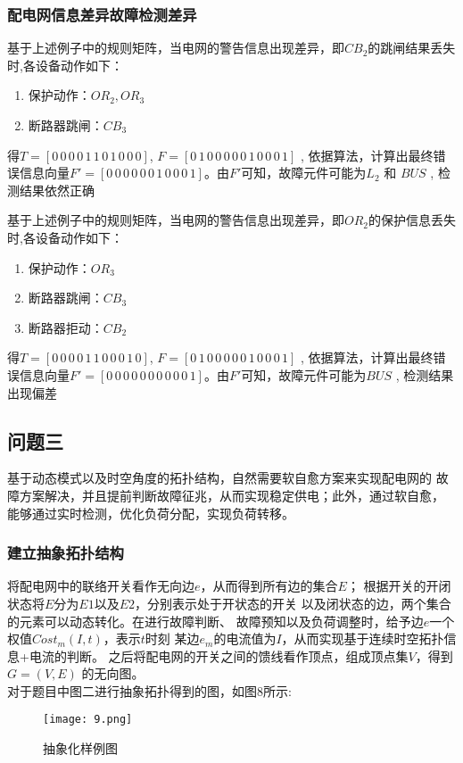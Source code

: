 \documentclass[withoutpreface,bwprint]{cumcmthesis} %
\begin{document}
\subsubsection{配电网信息差异故障检测差异}
\indent 基于上述例子中的规则矩阵，当电网的警告信息出现差异，即$CB_2$的跳闸结果丢失时,各设备动作如下：
\begin{enumerate}[itemindent=4em]
    \item 保护动作：$OR_2 , OR_3$
    \item 断路器跳闸：$CB_3$
\end{enumerate}
得$T = [0\,0\,0\,0\,1\,1\,0\,1\,0\,0\,0] $, $F = [0\,1\,0\,0\,0\,0\,0\,1\,0\,0\,0\,1]$ , 依据算法，计算出最终错误信息向量$F' = [0\,0\,0\,0\,0\,0\,1\,0\,0\,0\,1]$。由$F'$可知，故障元件可能为$L_2$ 和 $BUS$ , 检测结果依然正确

\indent 基于上述例子中的规则矩阵，当电网的警告信息出现差异，即$OR_2$的保护信息丢失时,各设备动作如下：
\begin{enumerate}[itemindent=4em]
    \item 保护动作：$OR_3$
    \item 断路器跳闸：$CB_3$
    \item 断路器拒动：$CB_2$
\end{enumerate}
得$T = [0\,0\,0\,0\,1\,1\,0\,0\,0\,1\,0] $, $F = [0\,1\,0\,0\,0\,0\,0\,1\,0\,0\,0\,1]$ , 依据算法，计算出最终错误信息向量$F' = [0\,0\,0\,0\,0\,0\,0\,0\,0\,0\,1]$。由$F'$可知，故障元件可能为$BUS$ , 检测结果出现偏差

\subsection{问题三}
基于动态模式以及时空角度的拓扑结构，自然需要软自愈方案来实现配电网的
故障方案解决，并且提前判断故障征兆，从而实现稳定供电；此外，通过软自愈，
能够通过实时检测，优化负荷分配，实现负荷转移。
\subsubsection{建立抽象拓扑结构}
将配电网中的联络开关看作无向边$e$，从而得到所有边的集合$E$；
根据开关的开闭状态将$E$分为$E1$以及$E2$，分别表示处于开状态的开关
以及闭状态的边，两个集合的元素可以动态转化。在进行故障判断、
故障预知以及负荷调整时，给予边$e$一个权值$Cost_m(I,t)$，表示$t$时刻
某边$e_m$的电流值为$I$，从而实现基于连续时空拓扑信息+电流的判断。
之后将配电网的开关之间的馈线看作顶点，组成顶点集$V$，得到$G = (V,E)$ 
的无向图。\\
\indent 对于题目中图二进行抽象拓扑得到的图，如图8所示:
\begin{figure}[htbp]
    \centering
    \texttt{[image: 9.png]}
    \caption{抽象化样例图}
\end{figure}
\end{document}
